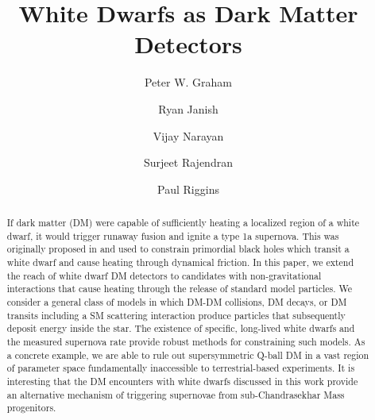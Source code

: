 \documentclass[twocolumn, preprintnumbers,amsmath,amssymb,prd, superscriptaddress]{revtex4}
\begin{document}


\title{White Dwarfs as Dark Matter Detectors}

\author{Peter W. Graham}

\author{Ryan Janish}

\author{Vijay Narayan}

\author{Surjeet Rajendran}

\author{Paul Riggins}

\begin{abstract}

If dark matter (DM) were capable of sufficiently heating a localized region of a white dwarf, it would trigger runaway fusion and ignite a type 1a supernova.
This was originally proposed in \cite{Graham:2015apa} and used to constrain primordial black holes which transit a white dwarf and cause heating through dynamical friction.
In this paper, we extend the reach of white dwarf DM detectors to candidates with non-gravitational interactions that cause heating through the release of standard model particles.
We consider a general class of models in which DM-DM collisions, DM decays, or DM transits including a SM scattering interaction produce particles that subsequently deposit energy inside the star.
The existence of specific, long-lived white dwarfs and the measured supernova rate provide robust methods for constraining such models.
As a concrete example, we are able to rule out supersymmetric Q-ball DM in a vast region of parameter space fundamentally inaccessible to terrestrial-based experiments.
It is interesting that the DM encounters with white dwarfs discussed in this work provide an alternative mechanism of triggering supernovae from sub-Chandrasekhar Mass progenitors.


\end{abstract}
\maketitle
\onecolumngrid
\tableofcontents
\clearpage
\twocolumngrid
\end{document}
